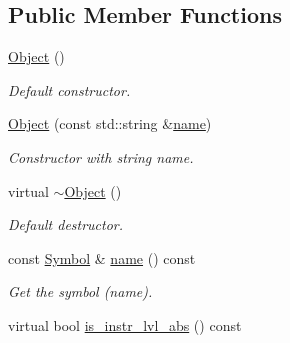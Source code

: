 \subsection*{Public Member Functions}
\begin{DoxyCompactItemize}
\item 
\mbox{\label{classilang_1_1_object_acd2c81efbfd62f8d4de1d3007a187fc5}} 
\mbox{\hyperlink{classilang_1_1_object_acd2c81efbfd62f8d4de1d3007a187fc5}{Object}} ()
\begin{DoxyCompactList}\small\item\em Default constructor. \end{DoxyCompactList}\item 
\mbox{\label{classilang_1_1_object_a12c8abc39d9d9d4fb1876ce54970e880}} 
\mbox{\hyperlink{classilang_1_1_object_a12c8abc39d9d9d4fb1876ce54970e880}{Object}} (const std\+::string \&\mbox{\hyperlink{classilang_1_1_object_acf20b072e69f572910d7d80c93af0b38}{name}})
\begin{DoxyCompactList}\small\item\em Constructor with string name. \end{DoxyCompactList}\item 
\mbox{\label{classilang_1_1_object_a3d9140b62e70e2b96537aa4452932197}} 
virtual \mbox{\hyperlink{classilang_1_1_object_a3d9140b62e70e2b96537aa4452932197}{$\sim$\+Object}} ()
\begin{DoxyCompactList}\small\item\em Default destructor. \end{DoxyCompactList}\item 
\mbox{\label{classilang_1_1_object_acf20b072e69f572910d7d80c93af0b38}} 
const \mbox{\hyperlink{classilang_1_1_symbol}{Symbol}} \& \mbox{\hyperlink{classilang_1_1_object_acf20b072e69f572910d7d80c93af0b38}{name}} () const
\begin{DoxyCompactList}\small\item\em Get the symbol (name). \end{DoxyCompactList}\item 
\mbox{\label{classilang_1_1_object_aee41c5fd5a09e58fe4f2217eacf0a7ab}} 
virtual bool \mbox{\hyperlink{classilang_1_1_object_aee41c5fd5a09e58fe4f2217eacf0a7ab}{is\+\_\+instr\+\_\+lvl\+\_\+abs}} () const

\end{DoxyCompactItemize}

